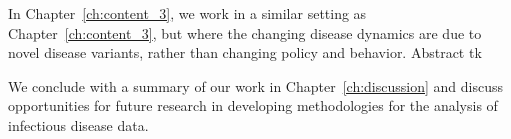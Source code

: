 In Chapter~\ref{ch:content_3}, we work in a similar setting as Chapter~\ref{ch:content_3}, but where the changing disease dynamics are due to novel disease variants, rather than changing policy and behavior.
Abstract tk

We conclude with a summary of our work in Chapter~\ref{ch:discussion} and discuss opportunities for future research in developing methodologies for the analysis of infectious disease data.

\label{sec:thesis_contributions}









